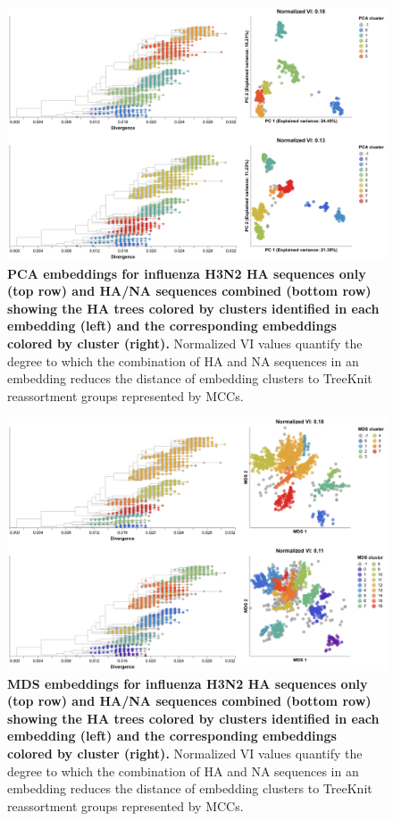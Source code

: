 \begin{figure}[!h]
\includegraphics[width=\columnwidth]{figures/flu-2016-2018-ha-na-pca-by-cluster.png}
\caption{{\bf PCA embeddings for influenza H3N2 HA sequences only (top row) and HA/NA sequences combined (bottom row) showing the HA trees colored by clusters identified in each embedding (left) and the corresponding embeddings colored by cluster (right).}
  Normalized VI values quantify the degree to which the combination of HA and NA sequences in an embedding reduces the distance of embedding clusters to TreeKnit reassortment groups represented by MCCs.}\label{S_Fig_flu_ha_na_pca_embeddings}
\end{figure}

\begin{figure}[!h]
\includegraphics[width=\columnwidth]{figures/flu-2016-2018-ha-na-mds-by-cluster.png}
\caption{{\bf MDS embeddings for influenza H3N2 HA sequences only (top row) and HA/NA sequences combined (bottom row) showing the HA trees colored by clusters identified in each embedding (left) and the corresponding embeddings colored by cluster (right).}
  Normalized VI values quantify the degree to which the combination of HA and NA sequences in an embedding reduces the distance of embedding clusters to TreeKnit reassortment groups represented by MCCs.}\label{S_Fig_flu_ha_na_mds_embeddings}
\end{figure}

